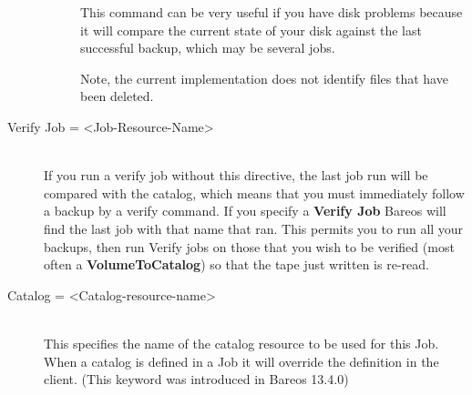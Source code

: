\begin{description}
\begin{description}
This command can be very useful if you have disk problems because it
will compare the current state of your disk against the last successful
backup, which may be several jobs.

Note, the current implementation does not identify files that
have been deleted.
\end{description}


\item [Verify Job = {\textless}Job-Resource-Name{\textgreater}] \hfill \\
If you run a verify job without this directive, the last job run will be
compared with the catalog, which means that you must immediately follow
a backup by a verify command.  If you specify a {\bf Verify Job} Bareos
will find the last job with that name that ran.  This permits you to run
all your backups, then run Verify jobs on those that you wish to be
verified (most often a {\bf VolumeToCatalog}) so that the tape just
written is re-read.

\item [Catalog = {\textless}Catalog-resource-name{\textgreater}] \hfill \\
This specifies the name of the catalog resource to be used for this Job.
When a catalog is defined in a Job it will override the definition in
the client. (This keyword was introduced in Bareos 13.4.0)


\end{description}
